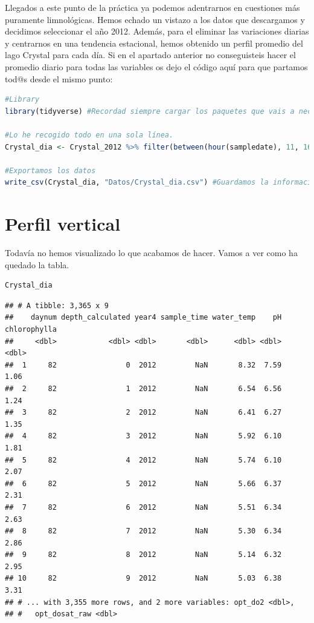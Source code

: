 \documentclass[
]{book}
\begin{document}
Llegados a este punto de la práctica ya podemos adentrarnos en cuestiones más puramente limnológicas. Hemos echado un vistazo a los datos que descargamos y decidimos seleccionar el año 2012. Además, para el eliminar las variaciones diarias y centrarnos en una tendencia estacional, hemos obtenido un perfil promedio del lago Crystal para cada día. Si en el apartado anterior no conseguisteis hacer el promedio diario para todas las variables os dejo el código aquí para que partamos tod@s desde el mismo punto:

\begin{lstlisting}[language=R]
#Library
library(tidyverse) #Recordad siempre cargar los paquetes que vais a necesitar al inicio del script

#Lo he recogido todo en una sola línea.
Crystal_dia <- Crystal_2012 %>% filter(between(hour(sampledate), 11, 16)) %>% group_by(daynum, depth_calculated) %>% summarise_if(is.numeric, mean, na.rm = TRUE)

#Exportamos los datos
write_csv(Crystal_dia, "Datos/Crystal_dia.csv") #Guardamos la información en un archivo
\end{lstlisting}

\hypertarget{perfil-vertical}{%
\section{Perfil vertical}\label{perfil-vertical}}

Todavía no hemos visualizado lo que acabamos de hacer. Vamos a ver como ha quedado la tabla.

\begin{lstlisting}[language=R]
Crystal_dia
\end{lstlisting}

\begin{lstlisting}
## # A tibble: 3,365 x 9
##    daynum depth_calculated year4 sample_time water_temp    pH chlorophylla
##     <dbl>            <dbl> <dbl>       <dbl>      <dbl> <dbl>        <dbl>
##  1     82                0  2012         NaN       8.32  7.59         1.06
##  2     82                1  2012         NaN       6.54  6.56         1.24
##  3     82                2  2012         NaN       6.41  6.27         1.35
##  4     82                3  2012         NaN       5.92  6.10         1.81
##  5     82                4  2012         NaN       5.74  6.10         2.07
##  6     82                5  2012         NaN       5.66  6.37         2.31
##  7     82                6  2012         NaN       5.51  6.34         2.63
##  8     82                7  2012         NaN       5.30  6.34         2.86
##  9     82                8  2012         NaN       5.14  6.32         2.95
## 10     82                9  2012         NaN       5.03  6.38         3.31
## # ... with 3,355 more rows, and 2 more variables: opt_do2 <dbl>,
## #   opt_dosat_raw <dbl>
\end{lstlisting}
\end{document}
